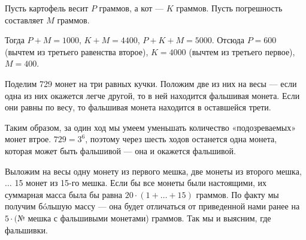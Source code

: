 ﻿

\begin{enumerate}
\itA Пусть картофель весит $P$ граммов, а кот — $K$ граммов. Пусть погрешность составляет $M$ граммов.

Тогда $P+M=1000$, $K+M=4400$, $P+K+M=5000$. Отсюда $P=600$ (вычтем из третьего равенства второе), $K=4000$ (вычтем из третьего первое), $M=400$.

\itB Поделим 729 монет на три равных кучки. Положим две из них на весы — если одна из них окажется легче другой, то в ней находится фальшивая монета. Если они равны по весу, то фальшивая монета находится в оставшейся трети.

Таким образом, за один ход мы умеем уменьшать количество «подозреваемых» монет втрое. $729 = 3^6$, поэтому через шесть ходов останется одна монета, которая может быть фальшивой — она и окажется фальшивой.

\itC Выложим на весы одну монету из первого мешка, две монеты из второго мешка,~$\ldots$ 15 монет из 15-го мешка. Если бы все монеты были настоящими, их суммарная масса была бы равна $20 \cdot (1+ \ldots + 15)$ граммов. По факту мы получим б\'oльшую массу — она будет отличаться от приведенной нами ранее на $5\cdot($№ мешка с фальшивыми монетами) граммов. Так мы и выясним, где фальшивки.
\end{enumerate}